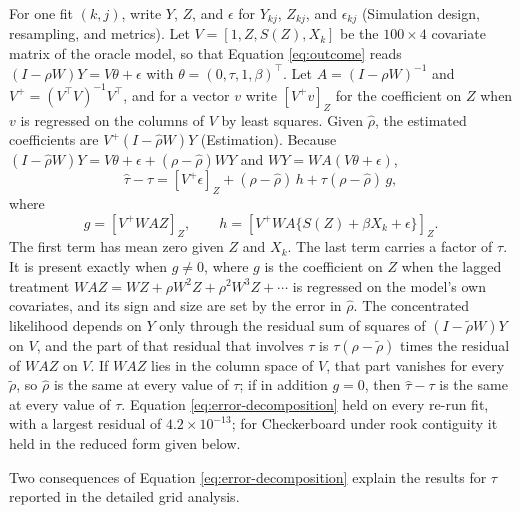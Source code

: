 \documentclass[11pt]{article}
\begin{document}
For one fit \((k, j)\), write \(Y\), \(Z\), and \(\epsilon\) for
\(Y_{kj}\), \(Z_{kj}\), and \(\epsilon_{kj}\) (Simulation design,
resampling, and metrics). Let \(V = [1, Z, S(Z), X_k]\) be the
\(100 \times 4\) covariate matrix of the oracle model, so that Equation
\ref{eq:outcome} reads \((I - \rho W)Y = V\theta + \epsilon\) with
\(\theta = (0, \tau, 1, \beta)^\top\). Let \(A = (I - \rho W)^{-1}\) and
\(V^{+} = (V^\top V)^{-1}V^\top\), and for a vector \(v\) write
\([V^{+}v]_Z\) for the coefficient on \(Z\) when \(v\) is regressed on
the columns of \(V\) by least squares. Given \(\hat\rho\), the estimated
coefficients are \(V^{+}(I - \hat\rho W)Y\) (Estimation). Because
\((I - \hat\rho W)Y = V\theta + \epsilon + (\rho - \hat\rho)WY\) and
\(WY = WA(V\theta + \epsilon)\), \begin{equation}
\hat\tau - \tau = [V^{+}\epsilon]_Z + (\rho - \hat\rho)\,h + \tau(\rho - \hat\rho)\,g,
\label{eq:error-decomposition}
\end{equation} where \[
g = [V^{+}WAZ]_Z, \qquad h = [V^{+}WA\{S(Z) + \beta X_k + \epsilon\}]_Z.
\] The first term has mean zero given \(Z\) and \(X_k\). The last term
carries a factor of \(\tau\). It is present exactly when \(g \neq 0\),
where \(g\) is the coefficient on \(Z\) when the lagged treatment
\(WAZ = WZ + \rho W^2 Z + \rho^2 W^3 Z + \cdots\) is regressed on the
model's own covariates, and its sign and size are set by the error in
\(\hat\rho\). The concentrated likelihood depends on \(Y\) only through
the residual sum of squares of \((I - \tilde\rho W)Y\) on \(V\), and the
part of that residual that involves \(\tau\) is
\(\tau(\rho - \tilde\rho)\) times the residual of \(WAZ\) on \(V\). If
\(WAZ\) lies in the column space of \(V\), that part vanishes for every
\(\tilde\rho\), so \(\hat\rho\) is the same at every value of \(\tau\);
if in addition \(g = 0\), then \(\hat\tau - \tau\) is the same at every
value of \(\tau\). Equation \ref{eq:error-decomposition} held on every
re-run fit, with a largest residual of \(4.2\times10^{-13}\); for
Checkerboard under rook contiguity it held in the reduced form given
below.

Two consequences of Equation \ref{eq:error-decomposition} explain the
results for \(\tau\) reported in the detailed grid analysis.
\end{document}
